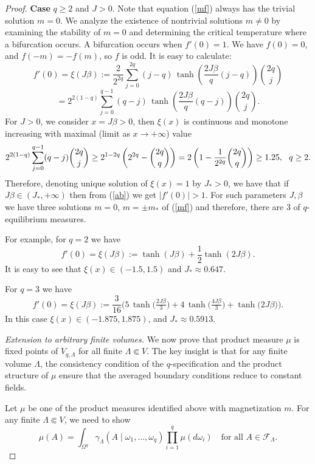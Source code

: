 \documentclass[11pt,reqno]{amsart}
\numberwithin{equation}{section} \setcounter{tocdepth}{1}
\begin{document}
\begin{proof}
{\bf Case} $ q \geq 2 $ and $J>0$. Note that  equation (\ref{mf}) always has the trivial solution $m=0$. We analyze the existence of nontrivial solutions $m\ne 0$ by examining the stability of $m=0$ and determining the critical temperature where a bifurcation occurs.
A bifurcation occurs when $f'(0)=1$.
We have $ f(0) = 0 $, and $ f(-m) = -f(m) $, so $ f $ is odd. It is easy to calculate:
$$
f'(0)=\xi(J\beta):= \frac{2}{2^{2q}} \sum_{j=0}^{2q} (j-q)\,
\tanh\!\left(\frac{2J\beta}{q}(j-q)\right)\binom{2q}{j}$$
\begin{equation}\label{ab}
=2^{2(1-q)} \sum_{j=0}^{q-1} (q-j)\,
\tanh\!\left(\frac{2J\beta}{q}(q-j)\right)\binom{2q}{j}.
\end{equation}
For $J>0$, we consider $x=J\beta>0$, then  $\xi(x)$ is continuous and monotone increasing with maximal (limit as $x\to +\infty$) value 
$$2^{2(1-q)} \sum_{j=0}^{q-1} (q-j)\binom{2q}{j}\geq 2^{1-2q} \left(2^{2q}-\binom{2q}{q}\right)=2\left(1-{1\over 2^{2q}}\binom{2q}{q}\right)\geq 1.25, \ \ q\geq 2.$$ Therefore, denoting unique solution of $\xi(x)=1$ by $J_*>0$, we have  that if $J\beta\in (J_*, +\infty)$ then from (\ref{ab}) we get $|f'(0)|>1$.  For such parameters $J, \beta$ we have three solutions $m=0$, $m=\pm m_*$ of (\ref{mf})  and therefore, there are 3 of $q$-equilibrium measures. 

For  example, for   $ q = 2 $ we have 
\begin{equation}\label{q2}
f'(0) =\xi(J\beta):= \tanh(J\beta) + \frac{1}{2} \tanh(2J\beta).
\end{equation}
It is easy to see that $\xi(x)\in (-1.5, 1.5)$ and 
$J_*\approx 0.647$.

For $q=3$ we have 
$$
f'(0)
= \xi(J\beta):=\frac{3}{16}\Bigg(5\,\tanh\!\Big(\tfrac{2J\beta}{3}\Big)
+ 4\,\tanh\!\Big(\tfrac{4J\beta}{3}\Big)
+ \tanh\!\big(2J\beta\big)\Bigg).
$$
In this case $\xi(x)\in (-1.875, 1.875)$, and 
$J_*\approx 0.5913$.

{\it  Extension to arbitrary finite volumes.}
We now prove that product measure $\mu$ is fixed points of $V_{q,\Lambda}$ for all finite $\Lambda \Subset V$. The key insight is that for any finite volume $\Lambda$, the consistency condition of the $q$-specification and the product structure of $\mu$ ensure that the averaged boundary conditions reduce to constant fields.

Let $\mu$ be one of the product measures identified above with magnetization $m$. For any finite $\Lambda \Subset V$, we need to show
$$
\mu(A) = \int_{\Omega^q} \gamma_\Lambda(A \mid \omega_1, \dots, \omega_q) \prod_{i=1}^q \mu(d\omega_i) \quad \text{for all } A \in \mathcal{F}_\Lambda.
$$


\end{proof}
\end{document}
